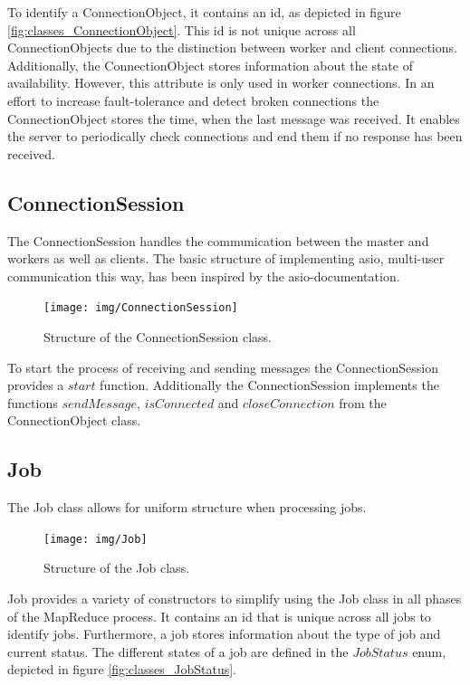 \documentclass[12pt, letterpaper]{article}
\begin{document}
To identify a ConnectionObject, it contains an id, as depicted in figure \ref{fig:classes_ConnectionObject}. This id is not unique across all ConnectionObjects due to the distinction between worker and client connections. Additionally, the ConnectionObject stores information about the state of availability. However, this attribute is only used in worker connections.\newline
In an effort to increase fault-tolerance and detect broken connections the ConnectionObject stores the time, when the last message was received. It enables the server to periodically check connections and end them if no response has been received.

\subsection{ConnectionSession}

The ConnectionSession handles the communication between the master and workers as well as clients.
The basic structure of implementing asio, multi-user communication this way, has been inspired by the asio-documentation.

\begin{figure}[h]
	\centering
	\texttt{[image: img/ConnectionSession]}
	\caption{Structure of the ConnectionSession class.}
	\label{fig:classes_ConnectionSession}
\end{figure}

To start the process of receiving and sending messages the ConnectionSession provides a $start$ function. Additionally the ConnectionSession implements the functions $sendMessage$, $isConnected$ and $closeConnection$ from the ConnectionObject class.  

\subsection{Job}

The Job class allows for uniform structure when processing jobs.

\begin{figure}[h]
	\centering
	\texttt{[image: img/Job]}
	\caption{Structure of the Job class.}
	\label{fig:classes_Job}
\end{figure}

Job provides a variety of constructors to simplify using the Job class in all phases of the MapReduce process. It contains an id that is unique across all jobs to identify jobs. Furthermore, a job stores information about the type of job and current status. The different states of a job are defined in the $JobStatus$ enum, depicted in figure \ref{fig:classes_JobStatus}.
\end{document}
